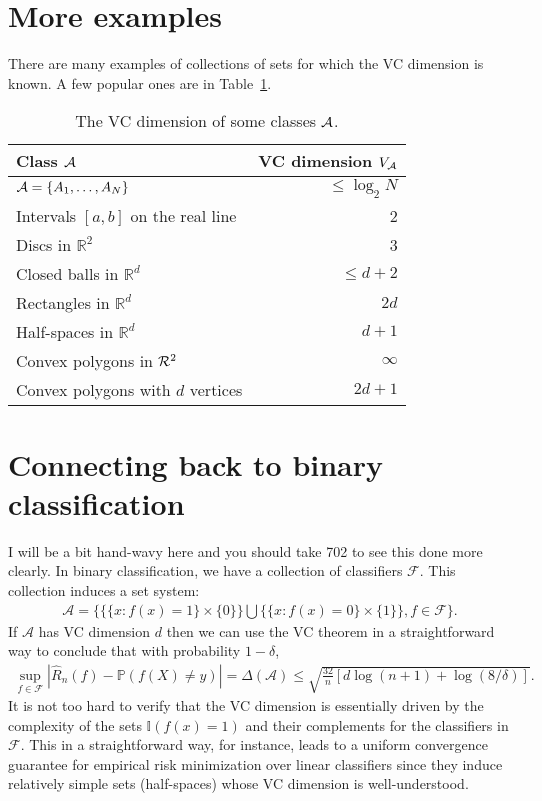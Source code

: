 \documentclass[twoside,12pt]{article}
\begin{document}
\section{More examples} 
There are many examples of collections of sets for which the VC dimension is known. A few popular ones are in Table~\ref{table::vc}.
\begin{table}[h]
\begin{center}
\begin{tabular}{lr}
Class ${\cal A}$ & VC dimension $V_{\cal A}$ \\ \hline
${\cal A}=\{A_1,\ldots, A_N\}$ & $\leq \log_2 N$\\
Intervals $[a,b]$ on the real line & 2\\
Discs in $\mathbb{R}^2$ & 3\\
Closed balls in $\mathbb{R}^d$ & $\leq d+2$\\
Rectangles in $\mathbb{R}^d$ & $2d$\\
Half-spaces in $\mathbb{R}^d$ & $d+1$\\
Convex polygons in ${\cal R}^2$ & $\infty$\\
Convex polygons with $d$ vertices & $2d+1$
\end{tabular}
\end{center}
\caption{The VC dimension of some classes ${\cal A}$.}
\label{table::vc}
\end{table}


\section{Connecting back to binary classification}
I will be a bit hand-wavy here and you should take 702 to see this done more clearly. In binary classification, we have a collection of classifiers $\mathcal{F}$. This collection induces a set system:
\begin{align*}
\mathcal{A} = \{\{ \{x: f(x) = 1\} \times \{0\} \} \bigcup \{ \{x: f(x) = 0\} \times \{1\}\}, f \in \mathcal{F}\}.
\end{align*}
If $\mathcal{A}$ has VC dimension $d$ then we can use the VC theorem in a straightforward way to conclude that with probability $1 - \delta$,
\begin{align*}
\sup_{f \in \mathcal{F}} |\widehat{R}_n(f) - \mathbb{P}(f(X) \neq y)| = \Delta(\mathcal{A}) \leq \sqrt{ \frac{32}{n} \left[ d \log(n+1) + \log(8/\delta) \right]}.
\end{align*}
It is not too hard to verify that the VC dimension is essentially driven by the complexity of the sets $\mathbb{I}(f(x) = 1)$ and their complements for the classifiers in $\mathcal{F}$. This in a straightforward way, for instance, leads to a uniform convergence guarantee for empirical risk minimization over linear classifiers since they induce relatively simple sets (half-spaces) whose VC dimension is well-understood.
\end{document}
